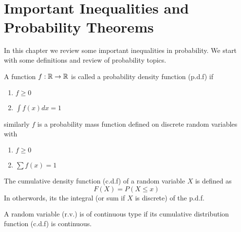 \documentclass[openany]{report}
\begin{document}
\chapter{Important Inequalities and Probability Theorems}
In this chapter we review some important inequalities in
probability. We start with some definitions and review of probability topics. 
\begin{definition}
    A function $f: \mathbb{R} \rightarrow \mathbb{R}$ is called a probability density function (p.d.f) if
    \begin{enumerate}[label=(\roman*)]
        \item $f \geq 0$
        \item $\int f(x)dx = 1$
    \end{enumerate}
    similarly $f$ is a probability mass function defined on discrete random variables with 
    \begin{enumerate}
        \item $f \geq 0$
        \item $\sum f(x) = 1$
    \end{enumerate}
\end{definition}
\begin{definition}
    The cumulative density function (c.d.f) of a random variable $X$ is defined as
    \[F(X) = P(X \leq x)\]
    In otherwords, its the integral (or sum if $X$ is discrete) of the p.d.f. 
\end{definition}
\begin{definition}
    A random variable (r.v.) is of continuous type if its cumulative distribution function (c.d.f) is continuous. 
\end{definition}
\end{document}
